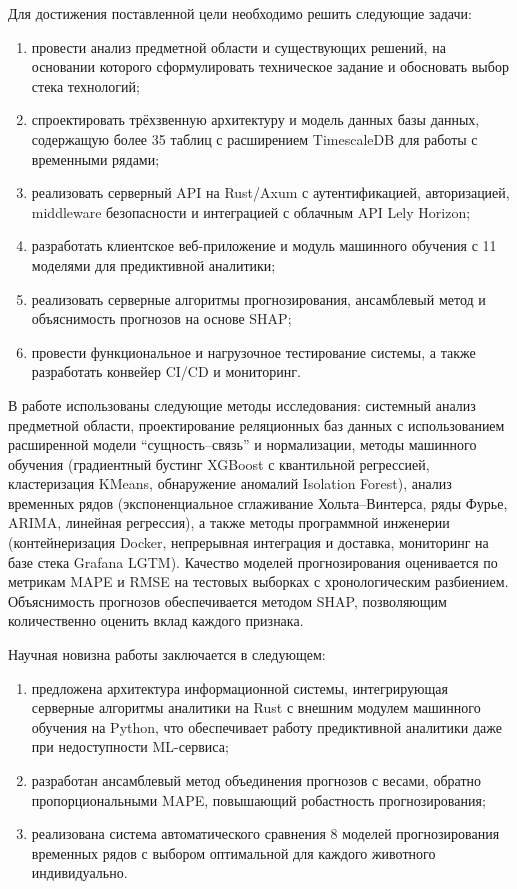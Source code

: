 Для достижения поставленной цели необходимо решить следующие задачи:
\begin{enumerate}
    \item провести анализ предметной области и существующих решений, на основании которого сформулировать техническое задание и обосновать выбор стека технологий;
    \item спроектировать трёхзвенную архитектуру и модель данных базы данных, содержащую более 35 таблиц с расширением TimescaleDB для работы с временными рядами;
    \item реализовать серверный API на Rust/Axum с аутентификацией, авторизацией, middleware безопасности и интеграцией с облачным API Lely Horizon;
    \item разработать клиентское веб-приложение и модуль машинного обучения с 11 моделями для предиктивной аналитики;
    \item реализовать серверные алгоритмы прогнозирования, ансамблевый метод и объяснимость прогнозов на основе SHAP;
    \item провести функциональное и нагрузочное тестирование системы, а также разработать конвейер CI/CD и мониторинг.
\end{enumerate}

В работе использованы следующие методы исследования: системный анализ предметной области, проектирование реляционных баз данных с использованием расширенной модели ``сущность--связь'' и нормализации, методы машинного обучения (градиентный бустинг XGBoost с квантильной регрессией, кластеризация KMeans, обнаружение аномалий Isolation Forest), анализ временных рядов (экспоненциальное сглаживание Хольта--Винтерса, ряды Фурье, ARIMA, линейная регрессия), а также методы программной инженерии (контейнеризация Docker, непрерывная интеграция и доставка, мониторинг на базе стека Grafana LGTM). Качество моделей прогнозирования оценивается по метрикам MAPE и RMSE на тестовых выборках с хронологическим разбиением. Объяснимость прогнозов обеспечивается методом SHAP, позволяющим количественно оценить вклад каждого признака.

Научная новизна работы заключается в следующем:
\begin{enumerate}
    \item предложена архитектура информационной системы, интегрирующая серверные алгоритмы аналитики на Rust с внешним модулем машинного обучения на Python, что обеспечивает работу предиктивной аналитики даже при недоступности ML-сервиса;
    \item разработан ансамблевый метод объединения прогнозов с весами, обратно пропорциональными MAPE, повышающий робастность прогнозирования;
    \item реализована система автоматического сравнения 8 моделей прогнозирования временных рядов с выбором оптимальной для каждого животного индивидуально.
\end{enumerate}

